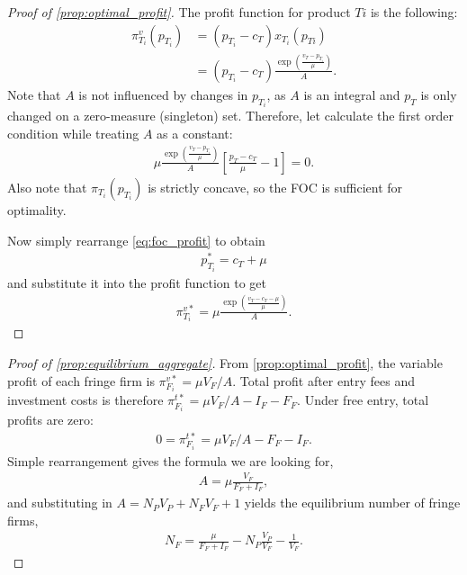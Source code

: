 \documentclass[a4paper]{article}
\begin{document}
\begin{proof}[Proof of \cref{prop:optimal_profit}]
    The profit function for product $Ti$ is the following:
    \begin{align*}
        \pi^v_{T_i}(p_{T_i}) &= (p_{T_i} - c_T) x_{T_i}(p_{Ti}) \\
        &= (p_{T_i} - c_T) \frac{\exp\left( \frac{v_T - p_{T_i}}{\mu} \right)}{A}.
    \end{align*}
    Note that $A$ is not influenced by changes in $p_{T_i}$, as $A$ is an integral and $p_T$ is only changed on a zero-measure (singleton) set.
    Therefore, let calculate the first order condition while treating $A$ as a constant:
    \begin{align}
        \label{eq:foc_profit}
        \mu \frac{\exp\left( \frac{v_T - p_{T_i}}{\mu} \right)}{A} \left[ \frac{p_T - c_T}{\mu} - 1 \right] = 0.
    \end{align}
    Also note that $\pi_{T_i}(p_{T_i})$ is strictly concave, so the FOC is sufficient for optimality.

    Now simply rearrange \cref{eq:foc_profit} to obtain
    \begin{align*}
        p_{T_i}^* = c_T + \mu
    \end{align*}
    and substitute it into the profit function to get
    \begin{align*}
        \pi_{T_i}^{v*} = \mu \frac{\exp \left( \frac{v_T - c_T - \mu}{\mu} \right)}{A}.
    \end{align*}
\end{proof}

\begin{proof}[Proof of \cref{prop:equilibrium_aggregate}]
    From \cref{prop:optimal_profit}, the variable profit of each fringe firm is $\pi_{F_i}^{v*} = \mu V_F / A$.
    Total profit after entry fees and investment costs is therefore $\pi_{F_i}^{t*} = \mu V_F / A - I_F - F_F$.
    Under free entry, total profits are zero:
    \begin{align*}
        0 = \pi_{F_i}^{t*} = \mu V_F / A - F_F - I_F.
    \end{align*}
    Simple rearrangement gives the formula we are looking for,
    \begin{align*}
        A = \mu \frac{V_F}{F_F + I_F},
    \end{align*}
    and substituting in $A = N_P V_P + N_F V_F + 1$ yields the equilibrium number of fringe firms,
    \begin{align*}
        N_F = \frac{\mu}{F_F + I_F} - N_P \frac{V_P}{V_F} - \frac{1}{V_F}.
    \end{align*}
\end{proof}
\end{document}
